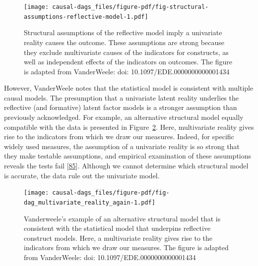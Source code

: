 \documentclass[
  singlecolumn]{article}
\begin{document}
\begin{figure}

{\centering \texttt{[image: causal-dags\_files/figure-pdf/fig-structural-assumptions-reflective-model-1.pdf]}

}

\caption{\label{fig-structural-assumptions-reflective-model}Structural
assumptions of the reflective model imply a univariate reality causes
the outcome. These assumptions are strong because they exclude
multivariate causes of the indicators for constructs, as well as
independent effects of the indicators on outcomes. The figure is adapted
from VanderWeele: doi: 10.1097/EDE.0000000000001434}

\end{figure}

However, VanderWeele notes that the statistical model is consistent with
multiple causal models. The presumption that a univariate latent reality
underlies the reflective (and formative) latent factor models is a
stronger assumption than previously acknowledged. For example, an
alternative structural model equally compatible with the data is
presented in Figure~\ref{fig-dag_multivariate_reality_again}. Here,
multivariate reality gives rise to the indicators from which we draw our
measures. Indeed, for specific widely used measures, the assumption of a
univariate reality is so strong that they make testable assumptions, and
empirical examination of these assumptions reveals the tests fail
{[}\protect\hyperlink{ref-vanderweele2022b}{85}{]}. Although we cannot
determine which structural model is accurate, the data rule out the
univariate model.

\begin{figure}

{\centering \texttt{[image: causal-dags\_files/figure-pdf/fig-dag\_multivariate\_reality\_again-1.pdf]}

}

\caption{\label{fig-dag_multivariate_reality_again}Vanderweele's example
of an alternative structural model that is consistent with the
statistical model that underpins reflective construct models. Here, a
multivariate reality gives rise to the indicators from which we draw our
measures. The figure is adapted from VanderWeele: doi:
10.1097/EDE.0000000000001434}

\end{figure}
\end{document}
